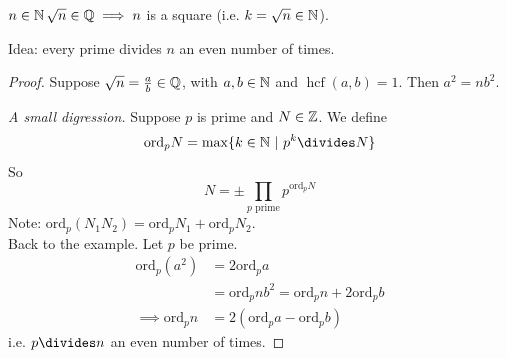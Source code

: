 \documentclass[10pt]{scrartcl}
\DeclareMathOperator{\hcf}{hcf}
\begin{document}
\begin{example}
$n \in\mathbb{N}\, \sqrt{n} \in\mathbb{Q} \implies n$ is a square (i.e. $k = \sqrt{n} \in\mathbb{N}$). 

Idea: every prime divides $n$ an even number of times. 

\begin{proof}
Suppose $\sqrt{n} = \frac{a}{b} \in\mathbb{Q}$, with $a,b \in\mathbb{N}$ and $\hcf(a,b) = 1$. Then $a^2 = nb^2$. 

\emph{A small digression.} Suppose $p$ is prime and $N \in\mathbb{Z}$. We define 
\[\mathrm{ord}_pN = \max\{k\iN ~|~ p^k \divides N \}\]
So \[N = \pm \displaystyle{\prod_{p \text{ prime}} p^{\mathrm{ord}_pN}}\]
Note: $\mathrm{ord}_p(N_1N_2) = \mathrm{ord}_pN_1 + \mathrm{ord}_pN_2$.\\

Back to the example. Let $p$ be prime. 
\[
\begin{aligned}
  \mathrm{ord}_p(a^2) &= 2 \mathrm{ord}_pa \\
  &= \mathrm{ord}_pnb^2 = \mathrm{ord}_pn + 2\mathrm{ord}_pb\\
  \implies \mathrm{ord}_pn &= 2(\mathrm{ord}_pa - \mathrm{ord}_pb)
\end{aligned}
\]
i.e. $p \divides n$ an even number of times.
\end{proof}
\end{example}\vspace*{10pt}
\end{document}

